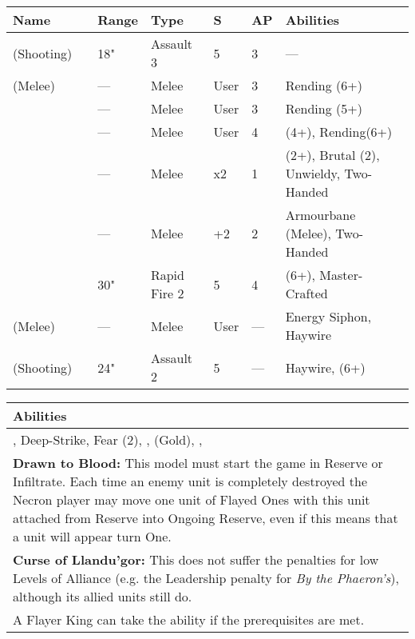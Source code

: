 \noindent
\begin{tabular}{||m{110pt} m{30pt} m{31pt} m{55pt} m{12pt} m{12pt} m{210pt}||}
	\hline
	Name & & Range & Type & S & AP & Abilities \\
	\hline
	\quickref{Staff of Light} (Shooting) & & 18" & Assault 3 & 5 & 3 & — \\
	\quickref{Staff of Light} (Melee) & & — & Melee & User & 3 & Rending (6+) \\
	\quickref{Hyperphase Sword} &  & — & Melee & User & 3 & Rending (5+) \\
	\quickref{Voidblade} &  & — & Melee & User & 4 & \quickref{Entropic Strike} (4+), Rending(6+) \\
	\quickref{Voidscythe} &  & — & Melee & x2 & 1 & \quickref{Entropic Strike} (2+), Brutal (2), Unwieldy, Two-Handed \\
	\quickref{Warscythe} &  & — & Melee & +2 & 2 & Armourbane (Melee), Two-Handed \\
	\quickref{Relic Gauss Blaster} & & 30" & Rapid Fire 2 & 5 & 4 & \quickref{Gauss} (6+), Master-Crafted \\
	\quickref{Rod of Night} (Melee) & & — & Melee & User & — & Energy Siphon, Haywire \\
	\quickref{Rod of Night} (Shooting) & & 24" & Assault 2 & 5 & — & Haywire, \quickref{Tesla} (6+) \\
	\hline
\end{tabular}

\noindent
\begin{tabular}{||m{532pt}||}
	\hline
	Abilities \\
	\hline
	\quickref{Command Protocols}, Deep-Strike, Fear (2), \quickref{Hyperspace Hunters}, \quickref{Nodal Command}(Gold), \quickref{Living Metal}, \quickref{Reanimation Protocols} \\
	\textbf{Drawn to Blood:} This model must start the game in Reserve or Infiltrate. Each time an enemy unit is completely destroyed the Necron player may move one unit of Flayed Ones with this unit attached from Reserve into Ongoing Reserve, even if this means that a unit will appear turn One. \\
	\textbf{Curse of Llandu'gor:} This does not suffer the penalties for low Levels of Alliance (e.g. the Leadership penalty for \textit{By the Phaeron's}), although its allied units still do. \\
	A Flayer King can take the \quickref{Tesserarion Nemesor} ability if the prerequisites are met. \\
	\hline
\end{tabular}

